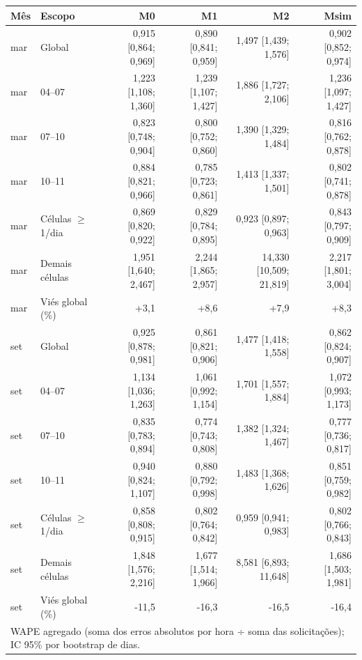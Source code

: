 \begin{tabular}{llrrrr}
\hline
Mês & Escopo & M0 & M1 & M2 & Msim \\
\hline
mar & Global & 0{,}915 [0{,}864; 0{,}969] & 0{,}890 [0{,}841; 0{,}959] & 1{,}497 [1{,}439; 1{,}576] & 0{,}902 [0{,}852; 0{,}974] \\
mar & 04--07 & 1{,}223 [1{,}108; 1{,}360] & 1{,}239 [1{,}107; 1{,}427] & 1{,}886 [1{,}727; 2{,}106] & 1{,}236 [1{,}097; 1{,}427] \\
mar & 07--10 & 0{,}823 [0{,}748; 0{,}904] & 0{,}800 [0{,}752; 0{,}860] & 1{,}390 [1{,}329; 1{,}484] & 0{,}816 [0{,}762; 0{,}878] \\
mar & 10--11 & 0{,}884 [0{,}821; 0{,}966] & 0{,}785 [0{,}723; 0{,}861] & 1{,}413 [1{,}337; 1{,}501] & 0{,}802 [0{,}741; 0{,}878] \\
mar & Células $\geq$ 1/dia & 0{,}869 [0{,}820; 0{,}922] & 0{,}829 [0{,}784; 0{,}895] & 0{,}923 [0{,}897; 0{,}963] & 0{,}843 [0{,}797; 0{,}909] \\
mar & Demais células & 1{,}951 [1{,}640; 2{,}467] & 2{,}244 [1{,}865; 2{,}957] & 14{,}330 [10{,}509; 21{,}819] & 2{,}217 [1{,}801; 3{,}004] \\
mar & Viés global (\%) & +3{,}1 & +8{,}6 & +7{,}9 & +8{,}3 \\
\hline
set & Global & 0{,}925 [0{,}878; 0{,}981] & 0{,}861 [0{,}821; 0{,}906] & 1{,}477 [1{,}418; 1{,}558] & 0{,}862 [0{,}824; 0{,}907] \\
set & 04--07 & 1{,}134 [1{,}036; 1{,}263] & 1{,}061 [0{,}992; 1{,}154] & 1{,}701 [1{,}557; 1{,}884] & 1{,}072 [0{,}993; 1{,}173] \\
set & 07--10 & 0{,}835 [0{,}783; 0{,}894] & 0{,}774 [0{,}743; 0{,}808] & 1{,}382 [1{,}324; 1{,}467] & 0{,}777 [0{,}736; 0{,}817] \\
set & 10--11 & 0{,}940 [0{,}824; 1{,}107] & 0{,}880 [0{,}792; 0{,}998] & 1{,}483 [1{,}368; 1{,}626] & 0{,}851 [0{,}759; 0{,}982] \\
set & Células $\geq$ 1/dia & 0{,}858 [0{,}808; 0{,}915] & 0{,}802 [0{,}764; 0{,}842] & 0{,}959 [0{,}941; 0{,}983] & 0{,}802 [0{,}766; 0{,}843] \\
set & Demais células & 1{,}848 [1{,}576; 2{,}216] & 1{,}677 [1{,}514; 1{,}966] & 8{,}581 [6{,}893; 11{,}648] & 1{,}686 [1{,}503; 1{,}981] \\
set & Viés global (\%) & -11{,}5 & -16{,}3 & -16{,}5 & -16{,}4 \\
\hline
\multicolumn{6}{l}{\footnotesize WAPE agregado (soma dos erros absolutos por hora ÷ soma das solicitações); IC 95\% por bootstrap de dias.} \\
\end{tabular}
